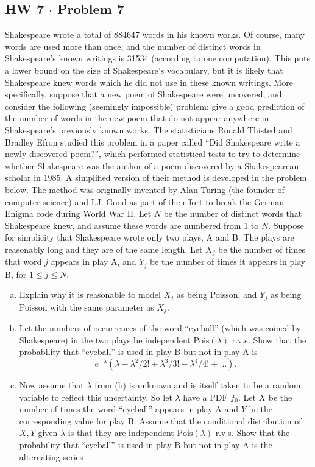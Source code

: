 \documentclass[11pt,a4paper]{article}
\begin{document}
\subsection{HW 7 $\cdot$ Problem 7}
\begin{tcolorbox}[title={HW 7 $\cdot$ Problem 7}]
Shakespeare wrote a total of 884647 words in his known works. Of course, many words are used more than once, and the number of distinct words in Shakespeare's known writings is 31534 (according to one computation). This puts a lower bound on the size of Shakespeare's vocabulary, but it is likely that Shakespeare knew words which he did not use in these known writings.
More specifically, suppose that a new poem of Shakespeare were uncovered, and consider the following (seemingly impossible) problem: give a good prediction of the number of words in the new poem that do not appear anywhere in Shakespeare's previously known works.
The statisticians Ronald Thisted and Bradley Efron studied this problem in a paper called ``Did Shakespeare write a newly-discovered poem?'', which performed statistical tests to try to determine whether Shakespeare was the author of a poem discovered by a Shakespearean scholar in 1985. A simplified version of their method is developed in the problem below. The method was originally invented by Alan Turing (the founder of computer science) and I.J. Good as part of the effort to break the German Enigma code during World War II.
Let $N$ be the number of distinct words that Shakespeare knew, and assume these words are numbered from 1 to $N$. Suppose for simplicity that Shakespeare wrote only two plays, A and B. The plays are reasonably long and they are of the same length. Let $X_j$ be the number of times that word $j$ appears in play A, and $Y_j$ be the number of times it appears in play B, for $1 \le j \le N$.
\begin{enumerate}[(a)]
\item Explain why it is reasonable to model $X_j$ as being Poisson, and $Y_j$ as being Poisson with the same parameter as $X_j$.
\item Let the numbers of occurrences of the word ``eyeball'' (which was coined by Shakespeare) in the two plays be independent $\text{Pois}(\lambda)$ r.v.s. Show that the probability that ``eyeball'' is used in play B but not in play A is
\[
e^{-\lambda}(\lambda - \lambda^2/2! + \lambda^3/3! - \lambda^4/4! + \dots).
\]
\item Now assume that $\lambda$ from (b) is unknown and is itself taken to be a random variable to reflect this uncertainty. So let $\lambda$ have a PDF $f_0$. Let $X$ be the number of times the word ``eyeball'' appears in play A and $Y$ be the corresponding value for play B. Assume that the conditional distribution of $X, Y$ given $\lambda$ is that they are independent $\text{Pois}(\lambda)$ r.v.s. Show that the probability that ``eyeball'' is used in play B but not in play A is the alternating series

\end{enumerate}
\end{tcolorbox}
\end{document}
